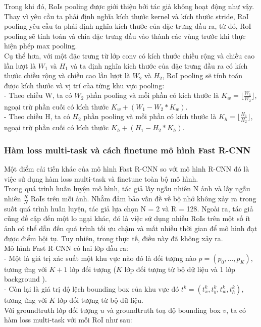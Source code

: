 {    \noindent
    Trong khi đó, RoIs pooling được giới thiệu bởi tác giả không hoạt động như vậy.
    Thay vì yêu cầu ta phải định nghĩa kích thước kernel và kích thước stride, RoI pooling yêu cầu ta phải định nghĩa kích thước của đặc trưng đầu ra, từ đó, RoI pooling sẽ tính toán và chia đặc trưng đầu vào thành các vùng trước khi thực hiện phép max pooling. \\
    Cụ thể hơn, với một đặc trưng từ lớp conv có kích thước chiều rộng và chiều cao lần lượt là ${W}_{1}$ và ${H}_{1}$ và ta định nghĩa kích thước của đặc trưng đầu ra có kích thước chiều rộng và chiều cao lần lượt là ${W}_{2}$ và ${H}_{2}$, RoI pooling sẽ tính toán được kích thước và vị trí của từng khu vực pooling: \\
    - Theo chiều W, ta có ${W}_{2}$ phần pooling và mỗi phần có kích thước là ${K}_{w} = \lfloor\frac{{W}_{1}}{{W}_{2}}\rfloor$, ngoại trừ phần cuối có kích thước ${K}_{w} + ({W}_{1} - {W}_{2} * {K}_{w})$. \\
    - Theo chiều H, ta có ${H}_{2}$ phần pooling và mỗi phần có kích thước là ${K}_{h} = \lfloor\frac{{H}_{1}}{{H}_{2}}\rfloor$, ngoại trừ phần cuối có kích thước ${K}_{h} + ({H}_{1} - {H}_{2} * {K}_{h})$. \\

    \subsubsection*{Hàm loss multi-task và cách finetune mô hình Fast R-CNN}
    Một điểm cải tiến khác của mô hình Fast R-CNN so với mô hình R-CNN đó là việc sử dụng hàm loss multi-task và finetune toàn bộ mô hình. \\
    Trong quá trình huấn luyện mô hình, tác giả lấy ngẫu nhiên N ảnh và lấy ngẫu nhiên $\frac{R}{N}$ RoIs trên mỗi ảnh.
    Nhằm đảm bảo vấn đề về bộ nhớ không xảy ra trong suốt quá trình huấn luyện, tác giả lựa chọn N = 2 và R = 128.
    Ngoài ra, tác giả cũng đề cập đến một lo ngại khác, đó là việc sử dụng nhiều RoIs trên một số ít ảnh có thể dẫn đến quá trình tối ưu chậm và mất nhiều thời gian để mô hình đạt được điểm hội tụ.
    Tuy nhiên, trong thực tế, điều này đã không xảy ra. \\
    Mô hình Fast R-CNN có hai lớp đầu ra: \\
    - Một là giá trị xác suất một khu vực nào đó là đối tượng nào $p = (p_0, \dots, p_K)$, tương ứng với $K + 1$ lớp đối tượng  ($K$ lớp đối tượng  từ bộ dữ liệu và 1 lớp background ). \\
    - Còn lại là giá trị độ lệch bounding box  của khu vực đó $t^{k} = (t^{k}_{x}, t^{k}_{y}, t^{k}_{w}, t^{k}_{h})$, tương ứng với $K$ lớp đối tượng  từ bộ dữ liệu. \\
    Với groundtruth  lớp đối tượng  $u$ và groundtruth  toạ độ bounding box  $v$, ta có hàm loss multi-task với mỗi RoI như sau:

}
